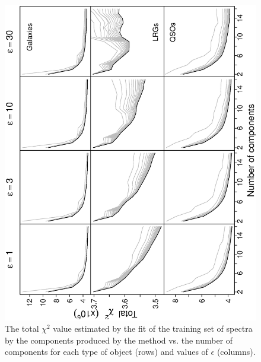 \documentclass[12pt,preprint]{aastex}
\begin{document}
\clearpage
\begin{figure}
\includegraphics[angle=-90,width=0.49\columnwidth]{paper_plots/fig1}
\caption{The total $\chi^2$ value estimated by the fit of the training
  set of spectra by the components produced by the method vs. the
  number of components for each type of object (rows) and values of
  $\epsilon$ (columns).}
\label{fig:1}
\end{figure}
\end{document}
